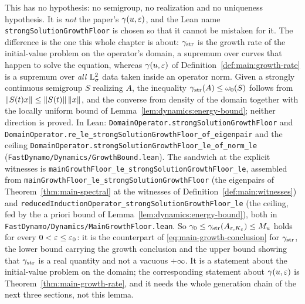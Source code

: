 This has no hypothesis: no semigroup, no realization and no uniqueness hypothesis.  It is
\emph{not} the paper's $\gamma(u,\varepsilon) $, and the Lean name
\texttt{strongSolutionGrowthFloor} is chosen so that it cannot be mistaken for it.  The
difference is the one this whole chapter is about: $\gamma_{\rm str} $ is the growth rate
of the initial-value problem on the operator's domain, a supremum over curves that happen
to solve the equation, whereas $\gamma(u,\varepsilon) $ of Definition~\ref{def:main:growth-rate}
is a supremum over \emph{all} $\mathrm{L}^2_\sigma $ data taken inside an operator norm.  Given a
strongly continuous semigroup $S $ realizing $A $, the inequality
$\gamma_{\rm str}(A)\leq\omega_0(S) $ follows from
$\left\|S(t)x\right\|\leq\left\|S(t)\right\|\left\|x\right\| $, and the converse from density of the domain
together with the locally uniform bound of Lemma~\ref{lem:dynamics:energy-bound}; neither
direction is proved.  In Lean:
\texttt{DomainOperator.strongSolutionGrowthFloor} and
\texttt{DomainOperator.re\_le\_strongSolutionGrowthFloor\_of\_eigenpair}
and the ceiling \texttt{DomainOperator.strongSolutionGrowthFloor\_le\_of\_norm\_le}
(\texttt{FastDynamo/Dynamics/GrowthBound.lean}).  The sandwich at the explicit witnesses is
\texttt{mainGrowthFloor\_le\_strongSolutionGrowthFloor\_le}, assembled from
\texttt{mainGrowthFloor\_le\_strongSolutionGrowthFloor} (the eigenpairs of
Theorem~\ref{thm:main-spectral} at the witnesses of Definition~\ref{def:main:witnesses})
and \texttt{reducedInductionOperator\_strongSolutionGrowthFloor\_le} (the ceiling, fed by
the a priori bound of Lemma~\ref{lem:dynamics:energy-bound}), both in
\texttt{FastDynamo/Dynamics/MainGrowthFloor.lean}.  So
$\gamma_0\leq\gamma_{\rm str}(A_{\varepsilon,K_\varepsilon})\leq M_u $ holds for every $0<\varepsilon\leq\varepsilon_0 $:
it is the counterpart of \eqref{eq:main-growth-conclusion} for $\gamma_{\rm str} $, the lower bound carrying the growth conclusion and the
upper bound showing that $\gamma_{\rm str} $ is a real quantity and not a vacuous
$+\infty $.  It is a statement about the initial-value problem on the domain; the
corresponding statement about $\gamma(u,\varepsilon) $ is Theorem~\ref{thm:main-growth-rate}, and
it needs the whole generation chain of the next three sections, not this lemma.

